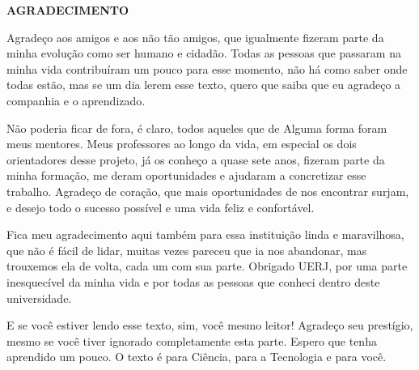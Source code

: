 \begin{center}
\textbf{AGRADECIMENTO}
\end{center}

$\!$\\

Agradeço aos amigos e aos não tão amigos, que igualmente fizeram parte da minha evolução como ser humano e cidadão. Todas as pessoas que passaram na minha vida contribuíram um pouco para esse momento, não há como saber onde todas estão, mas se um dia lerem esse texto, quero que saiba que eu agradeço a companhia e o aprendizado.

Não poderia ficar de fora, é claro, todos aqueles que de Alguma forma foram meus mentores. Meus professores ao longo da vida, em especial os dois orientadores desse projeto, já os conheço a quase sete anos, fizeram parte da minha formação, me deram oportunidades e ajudaram a concretizar esse trabalho. Agradeço de coração, que mais oportunidades de nos encontrar surjam, e desejo todo o sucesso possível e uma vida feliz e confortável.

Fica meu agradecimento aqui também para essa instituição linda e maravilhosa, que não é fácil de lidar, muitas vezes pareceu que ia nos abandonar, mas trouxemos ela de volta, cada um com sua parte. Obrigado UERJ, por uma parte inesquecível da minha vida e por todas as pessoas que conheci dentro deste universidade.

E se você estiver lendo esse texto, sim, você mesmo leitor! Agradeço seu prestígio, mesmo se você tiver ignorado completamente esta parte. Espero que tenha aprendido um pouco. O texto é para Ciência, para a Tecnologia e para você.

 